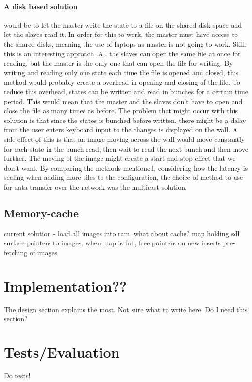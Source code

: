 \documentclass[12pt, a4paper, oneside]{article}
\begin{document}
\paragraph{A disk based solution}
would be to let the master write the state to a file on the shared disk space and let the slaves read it. In order for this to work, the master must have access to the shared disks, meaning the use of laptops as master is not going to work. Still, this is an interesting approach. All the slaves can open the same file at once for reading, but the master is the only one that can open the file for writing. By writing and reading only one state each time the file is opened and closed, this method would probably create a overhead in opening and closing of the file. To reduce this overhead, states can be written and read in bunches for a certain time period. This would mean that the master and the slaves don't have to open and close the file as many times as before. The problem that might occur with this solution is that since the states is bunched before written, there might be a delay from the user enters keyboard input to the changes is displayed on the wall. A side effect of this is that an image moving across the wall would move constantly for each state in the bunch read, then wait to read the next bunch and then move further. The moving of the image might create a start and stop effect that we don't want.
\newline
\newline
By comparing the methods mentioned, considering how the latency is scaling when adding more tiles to the configuration, the choice of method to use for data transfer over the network was the multicast solution. 

\subsection{Memory-cache}
current solution - load all images into ram. what about cache?
map holding sdl surface pointers to images. when map is full, free pointers on new inserts
pre-fetching of images
\newpage
\section{Implementation??}
The design section explains the most. Not sure what to write here. Do I need this section?
\section{Tests/Evaluation}
Do tests!
\end{document}
